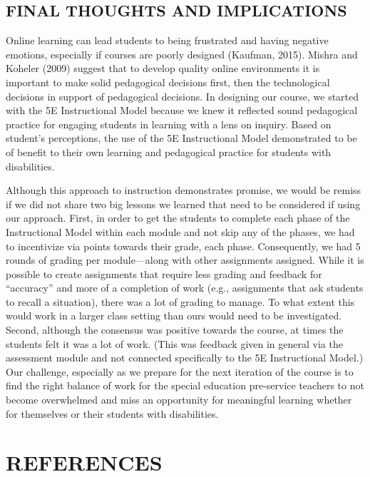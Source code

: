 \documentclass[11.5pt]{sig-alternate} %
\begin{document}
\begin{large}
\section*{FINAL THOUGHTS AND IMPLICATIONS}

Online learning can lead students to being frustrated and having negative emotions, especially if courses are poorly designed (Kaufman, 2015). Mishra and Koheler (2009) suggest that to develop quality online environments it is important to make solid pedagogical decisions first, then the technological decisions in support of pedagogical decisions. In designing our course, we started with the 5E Instructional Model because we knew it reflected sound pedagogical practice for engaging students in learning with a lens on inquiry. Based on student’s perceptions, the use of the 5E Instructional Model demonstrated to be of benefit to their own learning and pedagogical practice for students with disabilities.  

Although this approach to instruction demonstrates promise, we would be remiss if we did not share two big lessons we learned that need to be considered if using our approach. First, in order to get the students to complete each phase of the Instructional Model within each module and not skip any of the phases, we had to incentivize via points towards their grade, each phase. Consequently, we had 5 rounds of grading per module—along with other assignments assigned. While it is possible to create assignments that require less grading and feedback for “accuracy” and more of a completion of work (e.g., assignments that ask students to recall a situation), there was a lot of grading to manage. To what extent this would work in a larger class setting than ours would need to be investigated. Second, although the consensus was positive towards the course, at times the students felt it was a lot of work. (This was feedback given in general via the assessment module and not connected specifically to the 5E Instructional Model.) Our challenge, especially as we prepare for the next iteration of the course is to find the right balance of work for the special education pre-service teachers to not become overwhelmed and miss an opportunity for meaningful learning whether for themselves or their students with disabilities.

\end{large}
\clearpage 
\section*{REFERENCES}\par 
\end{document}
